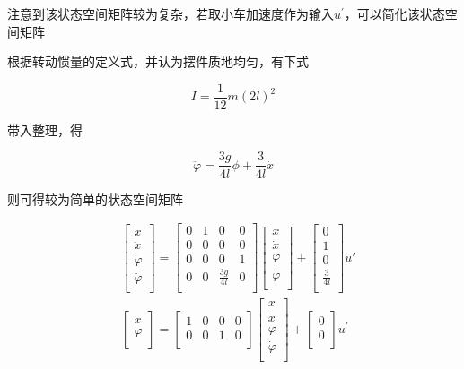 注意到该状态空间矩阵较为复杂，若取小车加速度作为输入$u^{'}$，可以简化该状态空间矩阵

根据转动惯量的定义式，并认为摆件质地均匀，有下式

\begin{equation}
I=\frac{1}{12}m(2l)^2
\end{equation}

带入整理，得

\begin{equation}
\ddot \varphi=\frac{3g}{4l}\phi+\frac{3}{4l}\ddot x
\end{equation}

则可得较为简单的状态空间矩阵

\begin{equation}
\begin{aligned}
&\begin{bmatrix}
\dot x\\
\ddot x\\
\dot{\varphi}\\
\ddot{\varphi}\\
\end{bmatrix}
=
\begin{bmatrix}
0 & 1 & 0 & 0\\
0 & 0 & 0 & 0\\
0 & 0 & 0 & 1\\
0 & 0 & \frac{3g}{4l} & 0\\
\end{bmatrix}
\begin{bmatrix}
x\\
\dot x\\
\varphi\\
\dot{\varphi}\\
\end{bmatrix}
+
\begin{bmatrix}
0\\
1\\
0\\
\frac{3}{4l}\\
\end{bmatrix}
u'\\
&\begin{bmatrix}
x\\
\varphi\\
\end{bmatrix}
=
\begin{bmatrix}
1 &0 &0 &0\\
0 &0 &1 &0\\
\end{bmatrix}
\begin{bmatrix}
x\\
\dot x\\
\varphi\\
\dot{\varphi}\\
\end{bmatrix}
+
\begin{bmatrix}
0\\
0\\
\end{bmatrix}
u^{'}\\
\end{aligned}
\end{equation}

